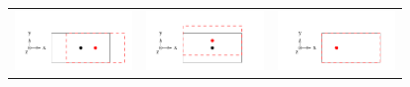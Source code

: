 \documentclass[12pt]{article}
\begin{document}
\begin{figure}
\begin{center}
\begin{tabular}{p{0.31\linewidth} p{0.31\linewidth} p{0.31\linewidth}}
  \begin{minipage}{\linewidth}
    \includegraphics[width=\linewidth]{chamber_alignment/dof_x.pdf}
  \end{minipage} &
  \begin{minipage}{\linewidth}
    \includegraphics[width=\linewidth]{chamber_alignment/dof_y.pdf}
  \end{minipage} &
  \begin{minipage}{\linewidth}
    \includegraphics[width=\linewidth]{chamber_alignment/dof_z.pdf}

\end{minipage}
\end{tabular}
\end{center}
\end{figure}
\end{document}
